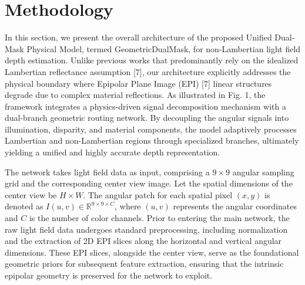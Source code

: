 \section{Methodology}

In this section, we present the overall architecture of the proposed Unified Dual-Mask Physical Model, termed GeometricDualMask, for non-Lambertian light field depth estimation. Unlike previous works that predominantly rely on the idealized Lambertian reflectance assumption [7], our architecture explicitly addresses the physical boundary where Epipolar Plane Image (EPI) [7] linear structures degrade due to complex material reflections. As illustrated in Fig. 1, the framework integrates a physics-driven signal decomposition mechanism with a dual-branch geometric routing network. By decoupling the angular signals into illumination, disparity, and material components, the model adaptively processes Lambertian and non-Lambertian regions through specialized branches, ultimately yielding a unified and highly accurate depth representation.

The network takes light field data as input, comprising a $9 \times 9$ angular sampling grid and the corresponding center view image. Let the spatial dimensions of the center view be $H \times W$. The angular patch for each spatial pixel $(x, y)$ is denoted as $I(u,v) \in \mathbb{R}^{9 \times 9 \times C}$, where $(u,v)$ represents the angular coordinates and $C$ is the number of color channels. Prior to entering the main network, the raw light field data undergoes standard preprocessing, including normalization and the extraction of 2D EPI slices along the horizontal and vertical angular dimensions. These EPI slices, alongside the center view, serve as the foundational geometric priors for subsequent feature extraction, ensuring that the intrinsic epipolar geometry is preserved for the network to exploit.


